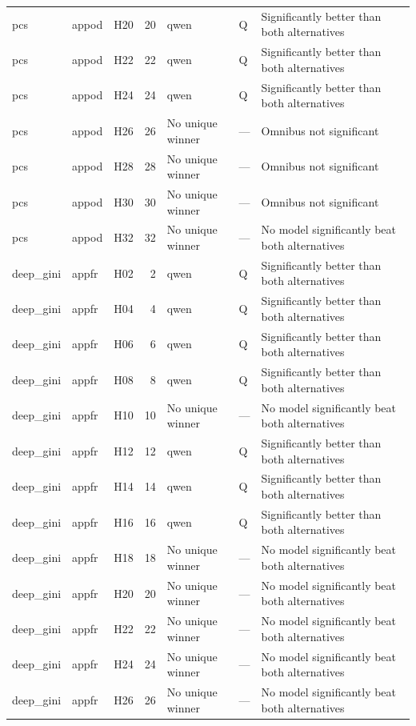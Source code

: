 \begin{longtable}{lllrlll}
pcs & appod & H20 & 20 & qwen & Q & Significantly better than both alternatives \\
pcs & appod & H22 & 22 & qwen & Q & Significantly better than both alternatives \\
pcs & appod & H24 & 24 & qwen & Q & Significantly better than both alternatives \\
pcs & appod & H26 & 26 & No unique winner & — & Omnibus not significant \\
pcs & appod & H28 & 28 & No unique winner & — & Omnibus not significant \\
pcs & appod & H30 & 30 & No unique winner & — & Omnibus not significant \\
pcs & appod & H32 & 32 & No unique winner & — & No model significantly beat both alternatives \\
deep\_gini & appfr & H02 & 2 & qwen & Q & Significantly better than both alternatives \\
deep\_gini & appfr & H04 & 4 & qwen & Q & Significantly better than both alternatives \\
deep\_gini & appfr & H06 & 6 & qwen & Q & Significantly better than both alternatives \\
deep\_gini & appfr & H08 & 8 & qwen & Q & Significantly better than both alternatives \\
deep\_gini & appfr & H10 & 10 & No unique winner & — & No model significantly beat both alternatives \\
deep\_gini & appfr & H12 & 12 & qwen & Q & Significantly better than both alternatives \\
deep\_gini & appfr & H14 & 14 & qwen & Q & Significantly better than both alternatives \\
deep\_gini & appfr & H16 & 16 & qwen & Q & Significantly better than both alternatives \\
deep\_gini & appfr & H18 & 18 & No unique winner & — & No model significantly beat both alternatives \\
deep\_gini & appfr & H20 & 20 & No unique winner & — & No model significantly beat both alternatives \\
deep\_gini & appfr & H22 & 22 & No unique winner & — & No model significantly beat both alternatives \\
deep\_gini & appfr & H24 & 24 & No unique winner & — & No model significantly beat both alternatives \\
deep\_gini & appfr & H26 & 26 & No unique winner & — & No model significantly beat both alternatives \\

\end{longtable}
